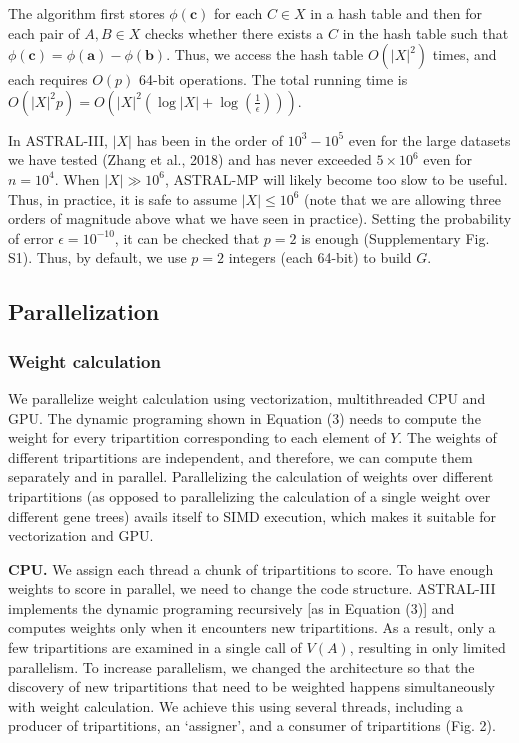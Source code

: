 \documentclass[12pt]{article}
\begin{document}
The algorithm first stores $\phi(\mathbf{c})$ for each $C \in X$ in a hash table and then for each pair of $A, B \in X$ checks whether there exists a $C$ in the hash table such that $\phi(\mathbf{c}) = \phi(\mathbf{a}) - \phi(\mathbf{b})$. Thus, we access the hash table $O(|X|^2)$ times, and each requires $O(p)$ 64-bit operations. The total running time is $O(|X|^2 p) = O(|X|^2 (\log |X| + \log (\frac{1}{\epsilon})))$.

In ASTRAL-III, $|X|$ has been in the order of $10^3 - 10^5$ even for the large datasets we have tested (Zhang et al., 2018) and has never exceeded $5 \times 10^6$ even for $n = 10^4$. When $|X| \gg 10^6$, ASTRAL-MP will likely become too slow to be useful. Thus, in practice, it is safe to assume $|X| \leq 10^6$ (note that we are allowing three orders of magnitude above what we have seen in practice). Setting the probability of error $\epsilon = 10^{-10}$, it can be checked that $p = 2$ is enough (Supplementary Fig. S1). Thus, by default, we use $p = 2$ integers (each 64-bit) to build $G$.

\subsection{Parallelization}

\subsubsection{Weight calculation}
We parallelize weight calculation using vectorization, multithreaded CPU and GPU. The dynamic programing shown in Equation (3) needs to compute the weight for every tripartition corresponding to each element of $Y$. The weights of different tripartitions are independent, and therefore, we can compute them separately and in parallel. Parallelizing the calculation of weights over different tripartitions (as opposed to parallelizing the calculation of a single weight over different gene trees) avails itself to SIMD execution, which makes it suitable for vectorization and GPU.

\textbf{CPU.} We assign each thread a chunk of tripartitions to score. To have enough weights to score in parallel, we need to change the code structure. ASTRAL-III implements the dynamic programing recursively [as in Equation (3)] and computes weights only when it encounters new tripartitions. As a result, only a few tripartitions are examined in a single call of $V(A)$, resulting in only limited parallelism. To increase parallelism, we changed the architecture so that the discovery of new tripartitions that need to be weighted happens simultaneously with weight calculation. We achieve this using several threads, including a producer of tripartitions, an `assigner', and a consumer of tripartitions (Fig. 2).
\end{document}
